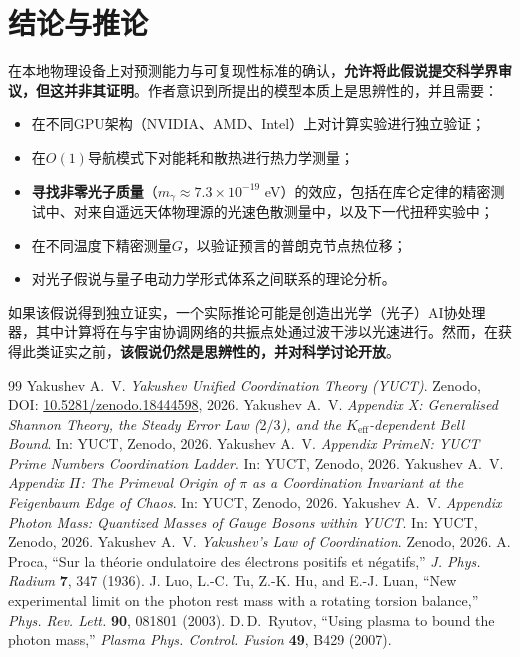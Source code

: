 \documentclass[11pt,a4paper]{article}
\begin{document}
	\section{结论与推论}
	在本地物理设备上对预测能力与可复现性标准的确认，\textbf{允许将此假说提交科学界审议，但这并非其证明}。作者意识到所提出的模型本质上是思辨性的，并且需要：
	\begin{itemize}
		\item 在不同GPU架构（NVIDIA、AMD、Intel）上对计算实验进行独立验证；
		\item 在$O(1)$导航模式下对能耗和散热进行热力学测量；
		\item \textbf{寻找非零光子质量}（$m_\gamma \approx 7.3 \times 10^{-19}$ eV）的效应，包括在库仑定律的精密测试中、对来自遥远天体物理源的光速色散测量中，以及下一代扭秤实验中；
		\item 在不同温度下精密测量$G$，以验证预言的普朗克节点热位移；
		\item 对光子假说与量子电动力学形式体系之间联系的理论分析。
	\end{itemize}
	
	如果该假说得到独立证实，一个实际推论可能是创造出光学（光子）AI协处理器，其中计算将在与宇宙协调网络的共振点处通过波干涉以光速进行。然而，在获得此类证实之前，\textbf{该假说仍然是思辨性的，并对科学讨论开放}。
	
	\begin{thebibliography}{99}
		Yakushev A.~V. \emph{Yakushev Unified Coordination Theory (YUCT)}. Zenodo, DOI: \href{https://doi.org/10.5281/zenodo.18444598}{10.5281/zenodo.18444598}, 2026.
		Yakushev A.~V. \emph{Appendix X: Generalised Shannon Theory, the Steady Error Law ($2/3$), and the $K_{\mathrm{eff}}$-dependent Bell Bound}. In: YUCT, Zenodo, 2026.
		Yakushev A.~V. \emph{Appendix PrimeN: YUCT Prime Numbers Coordination Ladder}. In: YUCT, Zenodo, 2026.
		Yakushev A.~V. \emph{Appendix $\Pi$: The Primeval Origin of $\pi$ as a Coordination Invariant at the Feigenbaum Edge of Chaos}. In: YUCT, Zenodo, 2026.
		Yakushev A.~V. \emph{Appendix Photon Mass: Quantized Masses of Gauge Bosons within YUCT}. In: YUCT, Zenodo, 2026.
		Yakushev A.~V. \emph{Yakushev's Law of Coordination}. Zenodo, 2026.
		A. Proca, “Sur la théorie ondulatoire des électrons positifs et négatifs,” \emph{J. Phys. Radium} \textbf{7}, 347 (1936).
		J. Luo, L.-C. Tu, Z.-K. Hu, and E.-J. Luan, “New experimental limit on the photon rest mass with a rotating torsion balance,” \emph{Phys. Rev. Lett.} \textbf{90}, 081801 (2003).
		D.\,D.\ Ryutov, “Using plasma to bound the photon mass,” \emph{Plasma Phys. Control. Fusion} \textbf{49}, B429 (2007).
	\end{thebibliography}
	
\end{document}
